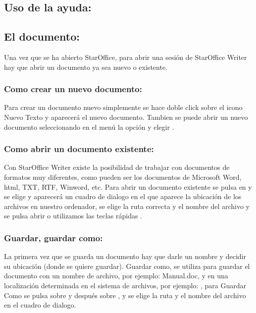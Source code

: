 \subsection{Uso de la ayuda: }


\subsection{El documento:}

Una vez que se ha abierto StarOffice, para abrir una sesión de StarOffice Writer hay
que abrir un documento ya sea nuevo o existente.


\subsubsection{Como crear un nuevo documento:}

Para crear un documento nuevo simplemente se hace doble click sobre el icono
Nuevo Texto y aparecerá el nuevo documento. Tambien se puede abrir un nuevo
documento seleccionando en el menú  la opción  y elegir
 .


\subsubsection{Como abrir un documento existente:}

Con StarOffice Writer existe la posibilidad de trabajar con documentos de formatos
muy diferentes, como pueden ser los documentos de Microsoft Word, html, TXT,
RTF, Winword, etc. Para abrir un documento existente se pulsa en 
y se elige  y aparecerá un cuadro de dialogo en el que aparece la
ubicación de los archivos en nuestro ordenador, se elige la ruta correcta y
el nombre del archivo y se pulsa abrir o utilizamos las teclas rápidas .



\subsubsection{Guardar, guardar como:}

La primera vez que se guarda un documento hay que darle un nombre y decidir
su ubicación (donde se quiere guardar). Guardar como, se utiliza para guardar
el documento con un nombre de archivo, por ejemplo: Manual.doc, y en una localización
determinada en el sistema de archivos, por ejemplo: ,
para Guardar Como se pulsa sobre  y después sobre ,
y se elige la ruta y el nombre del archivo en el cuadro de dialogo.

